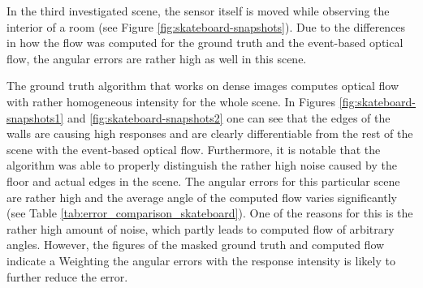 In the third investigated scene, the sensor itself is moved while observing the interior of a room (see Figure \ref{fig:skateboard-snapshots}). 
Due to the differences in how the flow was computed for the ground truth and the event-based optical flow, the angular errors are rather high as well in this scene.

The ground truth algorithm that works on dense images computes optical flow with rather homogeneous intensity for the whole scene.
In Figures \ref{fig:skateboard-snapshots1} and \ref{fig:skateboard-snapshots2} one can see that the edges of the walls are causing high responses and are clearly differentiable from the rest of the scene with the event-based optical flow.
Furthermore, it is notable that the algorithm was able to properly distinguish the rather high noise caused by the floor and actual edges in the scene.
The angular errors for this particular scene are rather high and the average angle of the computed flow varies significantly (see Table \ref{tab:error_comparison_skateboard}). 
One of the reasons for this is the rather high amount of noise, which partly leads to computed flow of arbitrary angles.
However, the figures of the masked ground truth and computed flow indicate a 
Weighting the angular errors with the response intensity is likely to further reduce the error.



